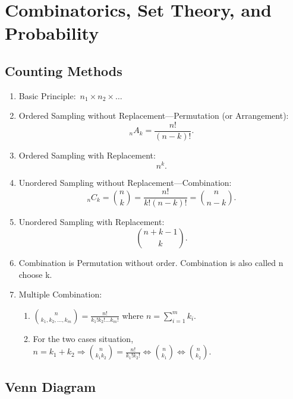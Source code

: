 \chapter{Combinatorics, Set Theory, and Probability}

\section{Counting Methods}
\begin{enumerate}
    \item Basic Principle:~$n_1\times n_2\times \ldots$
    \item Ordered Sampling without Replacement---Permutation (or Arrangement): \[{}_n A_k=\frac{n!}{(n-k)!}.\]
    \item Ordered Sampling with Replacement: \[n^k.\]
    \item Unordered Sampling without Replacement---Combination: \[{}_n C_k=\binom{n}{k}=\frac{n!}{k!(n-k)!}=\binom{n}{n-k}.\]
    \item Unordered Sampling with Replacement: \[\binom{n+k-1}{k}.\]
    \item Combination is Permutation without order. Combination is also called n choose k.
    \item Multiple Combination:{
        \begin{enumerate}
            \item $\binom{n}{k_1,k_2,\ldots,k_m}=\frac{n!}{k_1!k_2!\ldots k_m!}$ where $n=\sum_{i=1}^{m}k_i$.
            \item For the two cases situation, $n=k_1+k_2\Rightarrow \binom{n}{k_1k_2}=\frac{n!}{k_1!k_2!}\iff\binom{n}{k_1}\iff\binom{n}{k_2}$.
        \end{enumerate}
        }
\end{enumerate}

\section{Venn Diagram}

